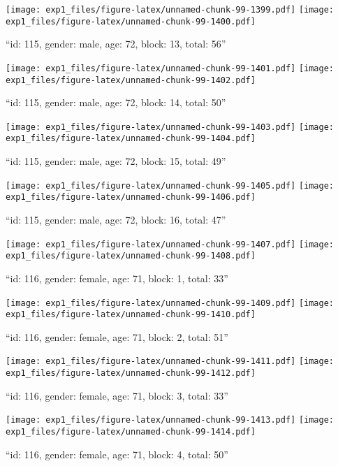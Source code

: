 \documentclass[,]{article}
\begin{document}
\texttt{[image: exp1\_files/figure-latex/unnamed-chunk-99-1399.pdf]}
\texttt{[image: exp1\_files/figure-latex/unnamed-chunk-99-1400.pdf]}

\newpage
[1] 

``id: 115, gender: male, age: 72, block: 13, total: 56''

\texttt{[image: exp1\_files/figure-latex/unnamed-chunk-99-1401.pdf]}
\texttt{[image: exp1\_files/figure-latex/unnamed-chunk-99-1402.pdf]}

\newpage
[1] 

``id: 115, gender: male, age: 72, block: 14, total: 50''

\texttt{[image: exp1\_files/figure-latex/unnamed-chunk-99-1403.pdf]}
\texttt{[image: exp1\_files/figure-latex/unnamed-chunk-99-1404.pdf]}

\newpage
[1] 

``id: 115, gender: male, age: 72, block: 15, total: 49''

\texttt{[image: exp1\_files/figure-latex/unnamed-chunk-99-1405.pdf]}
\texttt{[image: exp1\_files/figure-latex/unnamed-chunk-99-1406.pdf]}

\newpage
[1] 

``id: 115, gender: male, age: 72, block: 16, total: 47''

\texttt{[image: exp1\_files/figure-latex/unnamed-chunk-99-1407.pdf]}
\texttt{[image: exp1\_files/figure-latex/unnamed-chunk-99-1408.pdf]}

\newpage
[1] 

``id: 116, gender: female, age: 71, block: 1, total: 33''

\texttt{[image: exp1\_files/figure-latex/unnamed-chunk-99-1409.pdf]}
\texttt{[image: exp1\_files/figure-latex/unnamed-chunk-99-1410.pdf]}

\newpage
[1] 

``id: 116, gender: female, age: 71, block: 2, total: 51''

\texttt{[image: exp1\_files/figure-latex/unnamed-chunk-99-1411.pdf]}
\texttt{[image: exp1\_files/figure-latex/unnamed-chunk-99-1412.pdf]}

\newpage
[1] 

``id: 116, gender: female, age: 71, block: 3, total: 33''

\texttt{[image: exp1\_files/figure-latex/unnamed-chunk-99-1413.pdf]}
\texttt{[image: exp1\_files/figure-latex/unnamed-chunk-99-1414.pdf]}

\newpage
[1] 

``id: 116, gender: female, age: 71, block: 4, total: 50''
\end{document}
